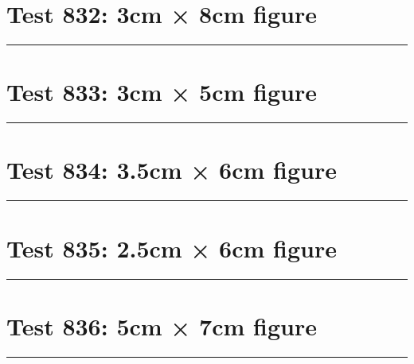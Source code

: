 \documentclass[a4paper,11pt]{article}
\begin{document}
\section*{Test 832: 3cm × 8cm figure}
\begin{swarmwrap}%
  \begin{minipage}[t]{3cm}
    \centering
    \rule{\linewidth}{8cm}
  \end{minipage}%
\end{swarmwrap}%
\swarmwrapnext
\lipsum[139]
\lipsum[140]
\lipsum[141]
\section*{Test 833: 3cm × 5cm figure}
\begin{swarmwrap}%
  \begin{minipage}[t]{3cm}
    \centering
    \rule{\linewidth}{5cm}
  \end{minipage}%
\end{swarmwrap}%
\swarmwrapnext
\lipsum[80]
\lipsum[81]
\lipsum[82]
\lipsum[83]
\lipsum[84]
\lipsum[85]
\section*{Test 834: 3.5cm × 6cm figure}
\begin{swarmwrap}%
  \begin{minipage}[t]{3cm}
    \centering
    \rule{\linewidth}{6cm}
  \end{minipage}%
\end{swarmwrap}%
\swarmwrapnext
\lipsum[25]
\lipsum[26]
\lipsum[27]
\section*{Test 835: 2.5cm × 6cm figure}
\begin{swarmwrap}%
  \begin{minipage}[t]{2cm}
    \centering
    \rule{\linewidth}{6cm}
  \end{minipage}%
\end{swarmwrap}%
\swarmwrapnext
\lipsum[57]
\lipsum[58]
\lipsum[59]
\section*{Test 836: 5cm × 7cm figure}
\begin{swarmwrap}%
  \begin{minipage}[t]{5cm}
    \centering
    \rule{\linewidth}{7cm}
  \end{minipage}%
\end{swarmwrap}%
\swarmwrapnext
\lipsum[25]
\lipsum[26]
\lipsum[27]
\lipsum[28]
\end{document}
